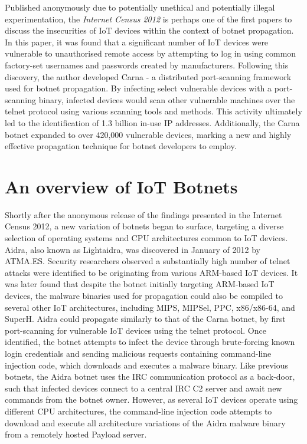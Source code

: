 Published anonymously due to potentially unethical and potentially illegal experimentation, the \textit{Internet Census 2012} \citep{Cencus2012} is perhaps one of the first papers to discuss the insecurities of IoT devices within the context of botnet propagation. In this paper, it was found that a significant number of IoT devices were vulnerable to unauthorised remote access by attempting to log in using common factory-set usernames and passwords created by manufacturers. Following this discovery, the author developed Carna - a distributed port-scanning framework used for botnet propagation. By infecting select vulnerable devices with a port-scanning binary, infected devices would scan other vulnerable machines over the telnet protocol using various scanning tools and methods. This activity ultimately led to the identification of 1.3 billion in-use IP addresses. Additionally, the Carna botnet expanded to over 420,000 vulnerable devices, marking a new and highly effective propagation technique for botnet developers to employ.




\section{An overview of IoT Botnets}

Shortly after the anonymous release of the findings presented in the Internet Census 2012, a new variation of botnets began to surface, targeting a diverse selection of operating systems and CPU architectures common to IoT devices. Aidra, also known as Lightaidra, \citep{AidraSource} was discovered in January of 2012 by ATMA.ES. \citep{ATMA2012} Security researchers observed a substantially high number of telnet attacks were identified to be originating from various ARM-based IoT devices. \citep{NJCCIC2016} It was later found that despite the botnet initially targeting ARM-based IoT devices, the malware binaries used for propagation could also be compiled to several other IoT architectures, including MIPS, MIPSel, PPC, x86/x86-64, and SuperH. Aidra could propagate similarly to that of the Carna botnet, by first port-scanning for vulnerable IoT devices using the telnet protocol. Once identified, the botnet attempts to infect the device through brute-forcing known login credentials and sending malicious requests containing command-line injection code, which downloads and executes a malware binary. Like previous botnets, the Aidra botnet uses the IRC communication protocol as a back-door, such that infected devices connect to a central IRC C2 server and await new commands from the botnet owner. However, as several IoT devices operate using different CPU architectures, the command-line injection code attempts to download and execute all architecture variations of the Aidra malware binary from a remotely hosted Payload server.

